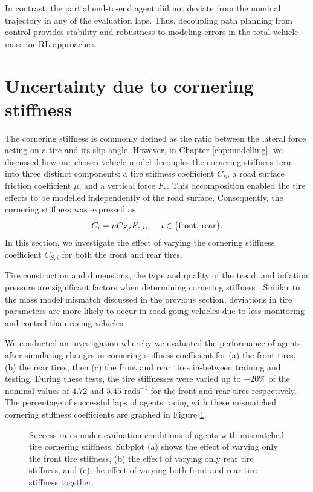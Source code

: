 In contrast, the partial end-to-end agent did not deviate from the nominal trajectory in any of the evaluation laps.
Thus, decoupling path planning from control provides stability and robustness to modeling errors in the total vehicle mass for RL approaches.


\section{Uncertainty due to cornering stiffness}

The cornering stiffness is commonly defined as the ratio between the lateral force acting on a tire and its slip angle. 
However, in Chapter \ref{chp:modelling}, we discussed how our chosen vehicle model \cite{Althoff2020} decouples the cornering stiffness term into three distinct components: a tire stiffness coefficient $C_S$, a road surface friction coefficient $\mu$, and a vertical force $F_z$. 
This decomposition enabled the tire effects to be modelled independently of the road surface. 
Consequently, the cornering stiffness was expressed as
\begin{equation}\label{eq:C_S_mismatch}
C_i = \mu C_{S,i} F_{z,i}, \hspace{0.5cm} i \in \{ \text{front, rear} \}.
\end{equation}
In this section, we investigate the effect of varying the cornering stiffness coefficient $C_{S,i}$ for both the front and rear tires.

Tire construction and dimensions, the type and quality of the tread, and inflation pressure are significant factors when determining cornering stiffness \cite{Vorotovic2013}.
Similar to the mass model mismatch discussed in the previous section, deviations in tire parameters are more likely to occur in road-going vehicles due to less monitoring and control than racing vehicles.

We conducted an investigation whereby we evaluated the performance of agents after simulating changes in cornering stiffness coefficient for (a) the front tires, (b) the rear tires, then (c) the front and rear tires in-between training and testing.
During these tests, the tire stiffnesses were varied up to $\pm 20 \%$ of the nominal values of $4.72$ and $5.45$ $\text{rads}^{-1}$ for the front and rear tires respectively.
The percentage of successful laps of agents racing with these mismatched cornering stiffness coefficients are graphed in Figure \ref{fig:c_s}.


\begin{figure}[htb!]
    \centering
    
    \caption[Success rate of agents under evaluation conditions with mismatched tire cornering stiffness]{Success rates under evaluation conditions of agents with mismatched tire cornering stiffness. Subplot (a) shows the effect of varying only the front tire stiffness, (b) the effect of varying only rear tire stiffness, and (c) the effect of varying both front and rear tire stiffness together.}
    \label{fig:c_s}
\end{figure}

